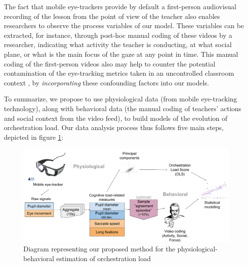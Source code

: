 \documentclass[10pt,journal,compsoc]{IEEEtran}
\begin{document}
The fact that mobile eye-trackers provide by default a first-person audiovisual recording of the lesson from the point of view of the teacher also enables researchers to observe the process variables of our model. These variables can be extracted, for instance, through post-hoc manual coding of these videos by a researcher, indicating what activity the teacher is conducting, at what social plane, or what is the main focus of the gaze at any point in time. This manual coding of the first-person videos also may help to counter the potential contamination of the eye-tracking metrics taken in an uncontrolled classroom context \cite{poole2006eye}, by \textit{incorporating} these confounding factors into our models.

To summarize, we propose to use physiological data (from mobile eye-tracking technology), along with behavioral data (the manual coding of teachers' actions and social context from the video feed), to build models of the evolution of orchestration load. Our data analysis process thus follows five main steps, depicted in figure \ref{fig:analysis}:

\begin{figure}[!t]
\centering
\includegraphics[width=\linewidth]{AnalysisMethodBase.png}
\caption{Diagram representing our proposed method for the physiological-behavioral estimation of orchestration load}
\label{fig:analysis}
\end{figure}
\end{document}
